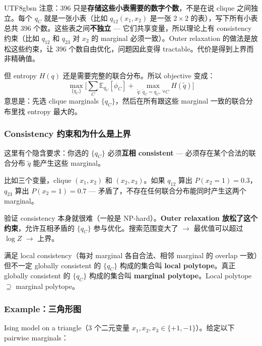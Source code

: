 \documentclass[11pt]{article}
\begin{document}
\begin{CJK}{UTF8}{gbsn}
注意：396 只是\textbf{存储这些小表需要的数字个数}，不是在说 clique 之间独立。每个 $q_C$ 就是一张小表（比如 $q_{12}(x_1,x_2)$ 是一张 $2\times 2$ 的表），写下所有小表总共 396 个数。这些表之间\textbf{不独立} --- 它们共享变量，所以理论上有 consistency 约束（比如 $q_{12}$ 和 $q_{23}$ 对 $x_2$ 的 marginal 必须一致）。Outer relaxation 的做法是放松这些约束，让 396 个数自由优化，问题因此变得 tractable。代价是得到上界而非精确值。

但 entropy $H(q)$ 还是需要完整的联合分布。所以 objective 变成：
\[
  \max_{\{q_C\}} \bigg[\sum_C \mathbb{E}_{q_C}[\phi_C] + \max_{\tilde{q}:\, \tilde{q}_C = q_C,\, \forall C} H(\tilde{q})\bigg]
\]
意思是：先选 clique marginals $\{q_C\}$，然后在所有跟这些 marginal 一致的联合分布里找 entropy 最大的。

\subsubsection{Consistency 约束和为什么是上界}

这里有个隐含要求：你选的 $\{q_C\}$ 必须\textbf{互相 consistent} --- 必须存在某个合法的联合分布 $\tilde{q}$ 能产生这些 marginal。

比如三个变量，clique $(x_1, x_2)$ 和 $(x_2, x_3)$。如果 $q_{12}$ 算出 $P(x_2=1) = 0.3$，$q_{23}$ 算出 $P(x_2=1) = 0.7$ --- 矛盾了，不存在任何联合分布能同时产生这两个 marginal。

验证 consistency 本身就很难（一般是 NP-hard）。\textbf{Outer relaxation 放松了这个约束}，允许互相矛盾的 $\{q_C\}$ 参与优化。搜索范围变大了 $\to$ 最优值可以超过 $\log Z$ $\to$ 上界。

满足 local consistency（每对 marginal 各自合法、相邻 marginal 的 overlap 一致）但不一定 globally consistent 的 $\{q_C\}$ 构成的集合叫 \textbf{local polytope}。真正 globally consistent 的 $\{q_C\}$ 构成的集合叫 \textbf{marginal polytope}。Local polytope $\supseteq$ marginal polytope。

\subsubsection{Example：三角形图}

Ising model on a triangle（3 个二元变量 $x_1, x_2, x_3 \in \{+1, -1\}$）。给定以下 pairwise marginals：


\end{CJK}
\end{document}
